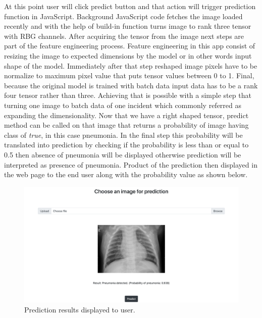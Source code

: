 At this point user will click predict button and that action will trigger prediction function in JavaScript.
Background JavaScript code fetches the image loaded recently and with the help of build-in function turns image to rank three tensor with RBG channels.
After acquiring the tensor from the image next steps are part of the feature engineering process.
Feature engineering in this app consist of resizing the image to expected dimensions by the model or in other words input shape of the model.
Immediately after that step reshaped image pixels have to be normalize to maximum pixel value that puts tensor values between 0 to 1.
Final, because the original model is trained with batch data input data has to be a rank four tensor rather than three.
Achieving that is possible with a simple step that turning one image to batch data of one incident which commonly referred as expanding the dimensionality.
Now that we have a right shaped tensor, predict method can be called on that image that returns a probability of image having class of \emph{true}, in this case pneumonia.
In the final step this probability will be translated into prediction by checking if the probability is less than or equal to 0.5 then absence of pneumonia will be displayed otherwise prediction will be interpreted as presence of pneumonia.
Product of the prediction then displayed in the web page to the end user along with the probability value as shown below.

\begin{figure}[H]
    \centering
    \includegraphics[width=\textwidth]{img/resultimg.png}
    \caption{Prediction results displayed to user.}
    \label{fig:appresult}
\end{figure}



